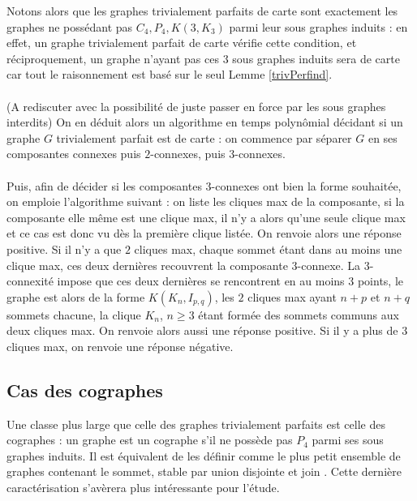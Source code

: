 \documentclass{scrartcl}
\begin{document}
\begin{flushleft}
Notons alors que les graphes trivialement parfaits de carte sont exactement les graphes ne possédant pas $C_4, P_4, K(3, K_3)$ parmi
leur sous graphes induits : en effet, un graphe trivialement parfait de carte vérifie cette condition, et réciproquement, un graphe
n'ayant pas ces $3$ sous graphes induits sera de carte car tout le raisonnement est basé sur le seul Lemme \ref{trivPerfind}.
\\~\\
(A rediscuter avec la possibilité de juste passer en force par les sous graphes interdits)
On en déduit alors un algorithme en temps polynômial décidant si un graphe $G$ trivialement parfait est de carte : on commence
par séparer $G$ en ses composantes connexes puis $2$-connexes, puis $3$-connexes.
\\~\\
Puis, afin de décider si les composantes $3$-connexes ont bien la forme souhaitée, on emploie l'algorithme suivant : on liste les cliques
max de la composante, si la composante elle même est une clique max, il n'y a alors qu'une seule clique max et ce cas est donc
vu dès la première clique listée. On renvoie alors une réponse positive. Si il n'y a que $2$ cliques max, chaque sommet étant
dans au moins une clique max, ces deux dernières recouvrent la composante $3$-connexe. La $3$-connexité impose que ces deux dernières
se rencontrent en au moins $3$ points, le graphe est alors de la forme $K(K_n, I_{p,q})$, les $2$ cliques max ayant $n+p$
et $n+q$ sommets chacune, la clique $K_n$, $n \geq 3$ étant formée des sommets communs aux deux cliques max. On renvoie alors
aussi une réponse positive. Si il y a plus de $3$ cliques max, on renvoie une réponse négative.

\subsection{Cas des cographes}

Une classe plus large que celle des graphes trivialement parfaits est celle des cographes : un graphe est un cographe s'il ne possède pas
$P_4$ parmi ses sous graphes induits. Il est équivalent de les définir comme le plus petit ensemble de graphes contenant le sommet, stable par
union disjointe et join \cite{cotrees}. Cette dernière caractérisation s'avèrera plus intéressante pour l'étude.\\


\end{flushleft}
\end{document}
